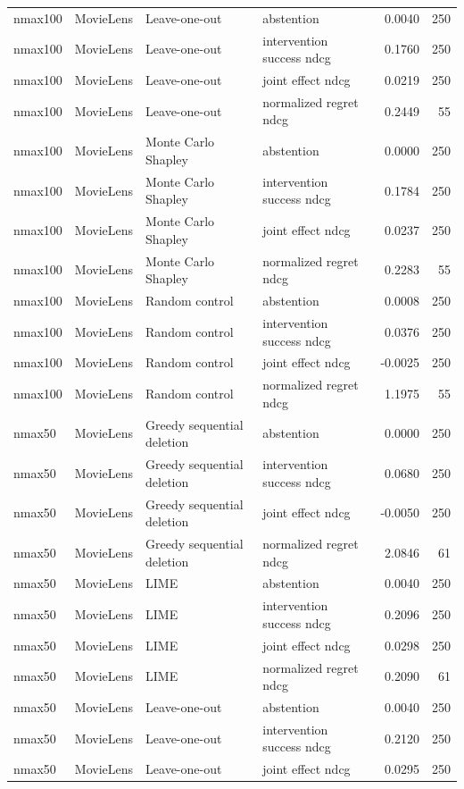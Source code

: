 \begin{longtable}{@{}p{.16\linewidth}p{.11\linewidth}p{.15\linewidth}p{.22\linewidth}rr@{}}
nmax100 & MovieLens & Leave-one-out & abstention & 0.0040 & 250 \\
nmax100 & MovieLens & Leave-one-out & intervention success ndcg & 0.1760 & 250 \\
nmax100 & MovieLens & Leave-one-out & joint effect ndcg & 0.0219 & 250 \\
nmax100 & MovieLens & Leave-one-out & normalized regret ndcg & 0.2449 & 55 \\
nmax100 & MovieLens & Monte Carlo Shapley & abstention & 0.0000 & 250 \\
nmax100 & MovieLens & Monte Carlo Shapley & intervention success ndcg & 0.1784 & 250 \\
nmax100 & MovieLens & Monte Carlo Shapley & joint effect ndcg & 0.0237 & 250 \\
nmax100 & MovieLens & Monte Carlo Shapley & normalized regret ndcg & 0.2283 & 55 \\
nmax100 & MovieLens & Random control & abstention & 0.0008 & 250 \\
nmax100 & MovieLens & Random control & intervention success ndcg & 0.0376 & 250 \\
nmax100 & MovieLens & Random control & joint effect ndcg & -0.0025 & 250 \\
nmax100 & MovieLens & Random control & normalized regret ndcg & 1.1975 & 55 \\
nmax50 & MovieLens & Greedy sequential deletion & abstention & 0.0000 & 250 \\
nmax50 & MovieLens & Greedy sequential deletion & intervention success ndcg & 0.0680 & 250 \\
nmax50 & MovieLens & Greedy sequential deletion & joint effect ndcg & -0.0050 & 250 \\
nmax50 & MovieLens & Greedy sequential deletion & normalized regret ndcg & 2.0846 & 61 \\
nmax50 & MovieLens & LIME & abstention & 0.0040 & 250 \\
nmax50 & MovieLens & LIME & intervention success ndcg & 0.2096 & 250 \\
nmax50 & MovieLens & LIME & joint effect ndcg & 0.0298 & 250 \\
nmax50 & MovieLens & LIME & normalized regret ndcg & 0.2090 & 61 \\
nmax50 & MovieLens & Leave-one-out & abstention & 0.0040 & 250 \\
nmax50 & MovieLens & Leave-one-out & intervention success ndcg & 0.2120 & 250 \\
nmax50 & MovieLens & Leave-one-out & joint effect ndcg & 0.0295 & 250 \\

\end{longtable}
